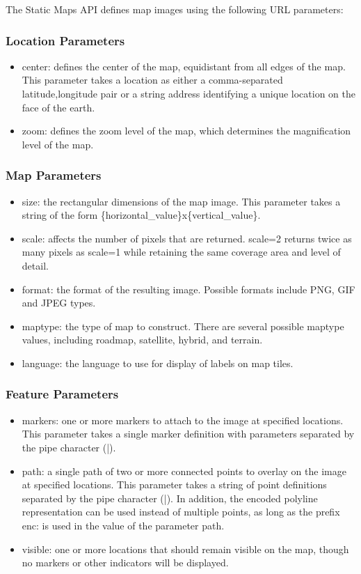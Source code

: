 The Static Maps API defines map images using the following URL parameters:

\subsubsection{Location Parameters}

\begin{itemize}
 \item center: defines the center of the map, equidistant from all edges of the map. This parameter takes a location as either a comma-separated {latitude,longitude} 
 pair or a string address identifying a unique location on the face of the earth.
 \item zoom: defines the zoom level of the map, which determines the magnification level of the map. 
\end{itemize}

\subsubsection{Map Parameters}

\begin{itemize}
 \item size: the rectangular dimensions of the map image. This parameter takes a string of the form \{horizontal\_value\}x\{vertical\_value\}. 
 \item scale: affects the number of pixels that are returned. scale=2 returns twice as many pixels as scale=1 while retaining the same coverage area and level of detail.
 \item format: the format of the resulting image. Possible formats include PNG, GIF and JPEG types.
 \item maptype: the type of map to construct. There are several possible maptype values, including roadmap, satellite, hybrid, and terrain. 
 \item language: the language to use for display of labels on map tiles.
\end{itemize}

\subsubsection{Feature Parameters}

\begin{itemize}
 \item markers: one or more markers to attach to the image at specified locations. This parameter takes a single marker definition with parameters separated 
 by the pipe character (|). 
 \item path: a single path of two or more connected points to overlay on the image at specified locations. This parameter takes a string of point definitions 
 separated by the pipe character (|). In addition, the encoded polyline representation can be used instead of multiple points, as long as the prefix enc: 
 is used in the value of the parameter path.
 \item visible: one or more locations that should remain visible on the map, though no markers or other indicators will be displayed. 
\end{itemize}

